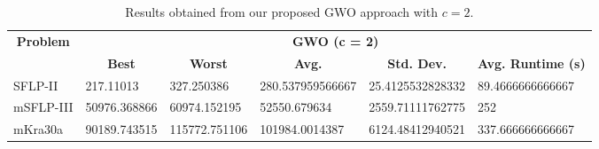\begin{table}[h!]
\begin{adjustwidth}{-1.18in}{}
	\centering
	\begin{tabular}{|l|l|l|l|l|l|}
	\hline
	\multicolumn{1}{|c|}{\multirow{2}{*}{\textbf{Problem}}} & \multicolumn{5}{c|}{\textbf{GWO (c = 2)}} \\ \cline{2-6} 
	\multicolumn{1}{|c|}{}                                  & \multicolumn{1}{c|}{\textbf{Best}} & \multicolumn{1}{c|}{\textbf{Worst}} & \multicolumn{1}{c|}{\textbf{Avg.}} & \multicolumn{1}{c|}{\textbf{Std. Dev.}} & \multicolumn{1}{c|}{\textbf{Avg. Runtime (s)}} \\ \hline
	SFLP-II                                                 & 217.11013                                  & 327.250386                                   & 280.537959566667                      & 25.4125532828332                                 & 89.4666666666667                                  \\ \hline
	mSFLP-III                                               & 50976.368866                                & 60974.152195                                 & 52550.679634						         & 2559.71111762775                              & 252                              \\ \hline
	mKra30a                                               & 90189.743515                               & 115772.751106                                &
	101984.0014387							&
	6124.48412940521							&
	337.666666666667						\\ \hline
	\end{tabular}
\end{adjustwidth}
\caption{Results obtained from our proposed GWO approach with $c = 2$.}
\label{approach-gwo-c2-results}
\end{table}

